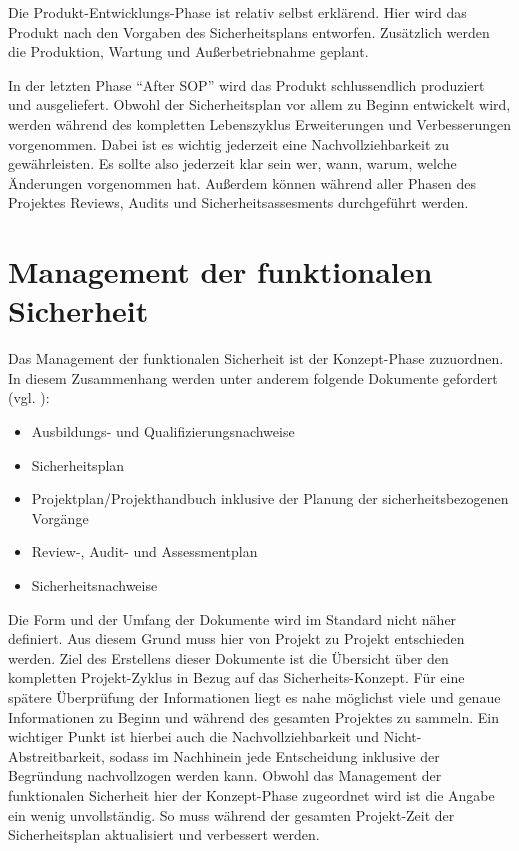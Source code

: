 \documentclass[a4paper,DIV=calc,ngerman]{scrartcl}
\begin{document}
Die Produkt-Entwicklungs-Phase ist relativ selbst erklärend. Hier wird das Produkt nach den Vorgaben des Sicherheitsplans entworfen. Zusätzlich werden die Produktion, Wartung und Außerbetriebnahme geplant.

In der letzten Phase "`After SOP"' wird das Produkt schlussendlich produziert und ausgeliefert. Obwohl der Sicherheitsplan vor allem zu Beginn entwickelt wird, werden während des kompletten Lebenszyklus Erweiterungen und Verbesserungen vorgenommen. Dabei ist es wichtig jederzeit eine Nachvollziehbarkeit zu gewährleisten. Es sollte also jederzeit klar sein wer, wann, warum, welche Änderungen vorgenommen hat. Außerdem können während aller Phasen des Projektes Reviews, Audits und Sicherheitsassesments durchgeführt werden. \cite[S. 121]{1}





\section{Management der funktionalen Sicherheit}
\label{sec:Management}
Das Management der funktionalen Sicherheit ist der Konzept-Phase zuzuordnen. In diesem Zusammenhang werden unter anderem folgende Dokumente gefordert (vgl. \cite[S. 121]{1}):

\begin{itemize}
    \item Ausbildungs- und Qualifizierungsnachweise
    \item Sicherheitsplan
    \item Projektplan/Projekthandbuch inklusive der Planung der sicherheitsbezogenen Vorgänge
    \item Review-, Audit- und Assessmentplan
    \item Sicherheitsnachweise
\end{itemize}

Die Form und der Umfang der Dokumente wird im Standard nicht näher definiert. Aus diesem Grund muss hier von Projekt zu Projekt entschieden werden. Ziel des Erstellens dieser Dokumente ist die Übersicht über den kompletten Projekt-Zyklus in Bezug auf das Sicherheits-Konzept. Für eine spätere Überprüfung der Informationen liegt es nahe möglichst viele und genaue Informationen zu Beginn und während des gesamten Projektes zu sammeln. Ein wichtiger Punkt ist hierbei auch die Nachvollziehbarkeit und Nicht-Abstreitbarkeit, sodass im Nachhinein jede Entscheidung inklusive der Begründung nachvollzogen werden kann. Obwohl das Management der funktionalen Sicherheit hier der Konzept-Phase zugeordnet wird ist die Angabe ein wenig unvollständig. So muss während der gesamten Projekt-Zeit der Sicherheitsplan aktualisiert und verbessert werden.
\end{document}
